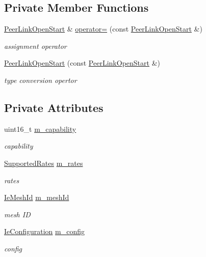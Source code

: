 \subsection*{Private Member Functions}
\begin{DoxyCompactItemize}
\item 
\hyperlink{classns3_1_1dot11s_1_1PeerLinkOpenStart}{Peer\+Link\+Open\+Start} \& \hyperlink{classns3_1_1dot11s_1_1PeerLinkOpenStart_a810353929969a0637a8b6feb3f841da2}{operator=} (const \hyperlink{classns3_1_1dot11s_1_1PeerLinkOpenStart}{Peer\+Link\+Open\+Start} \&)
\begin{DoxyCompactList}\small\item\em assignment operator \end{DoxyCompactList}\item 
\hyperlink{classns3_1_1dot11s_1_1PeerLinkOpenStart_af40acadbb4475687d7e92ed884f08016}{Peer\+Link\+Open\+Start} (const \hyperlink{classns3_1_1dot11s_1_1PeerLinkOpenStart}{Peer\+Link\+Open\+Start} \&)
\begin{DoxyCompactList}\small\item\em type conversion opertor \end{DoxyCompactList}\end{DoxyCompactItemize}
\subsection*{Private Attributes}
\begin{DoxyCompactItemize}
\item 
uint16\+\_\+t \hyperlink{classns3_1_1dot11s_1_1PeerLinkOpenStart_ab52ddeb6436f56074e1f8dd06a31ef76}{m\+\_\+capability}
\begin{DoxyCompactList}\small\item\em capability \end{DoxyCompactList}\item 
\hyperlink{classns3_1_1SupportedRates}{Supported\+Rates} \hyperlink{classns3_1_1dot11s_1_1PeerLinkOpenStart_aaa7ddece8c5a8e4cf2b2e1016f388840}{m\+\_\+rates}
\begin{DoxyCompactList}\small\item\em rates \end{DoxyCompactList}\item 
\hyperlink{classns3_1_1dot11s_1_1IeMeshId}{Ie\+Mesh\+Id} \hyperlink{classns3_1_1dot11s_1_1PeerLinkOpenStart_ac08a3117099028d7a87d2a4f28122509}{m\+\_\+mesh\+Id}
\begin{DoxyCompactList}\small\item\em mesh ID \end{DoxyCompactList}\item 
\hyperlink{classns3_1_1dot11s_1_1IeConfiguration}{Ie\+Configuration} \hyperlink{classns3_1_1dot11s_1_1PeerLinkOpenStart_ac16230ae21c59ff5b78ef0a435f54a02}{m\+\_\+config}
\begin{DoxyCompactList}\small\item\em config \end{DoxyCompactList}\end{DoxyCompactItemize}
